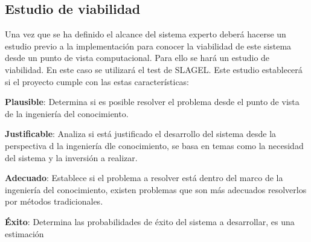 

\subsection{Estudio de viabilidad}

Una vez que se ha definido el alcance del sistema experto deberá hacerse un estudio
 previo a la implementación para conocer la viabilidad de este sistema desde un punto
 de vista computacional. Para ello se hará un estudio de viabilidad. En este caso se
 utilizará el test de SLAGEL. Este estudio establecerá si el proyecto cumple con las
 estas características:


\begin{compactitem}
  \item \textbf{Plausible}: Determina si es posible resolver el problema desde el
     punto de vista de la ingeniería del conocimiento.
  \item \textbf{Justificable}: Analiza si está justificado el desarrollo del
     sistema desde la perspectiva d la ingeniería dle conocimiento, se basa en
     temas como la necesidad del sistema y la inversión a realizar.
  \item \textbf{Adecuado}: Establece si el problema a resolver está dentro
     del marco de la ingeniería del conocimiento, existen problemas que son más
     adecuados resolverlos por métodos tradicionales.
  \item \textbf{Éxito}: Determina las probabilidades de éxito del sistema a
     desarrollar, es una estimación
\end{compactitem}


